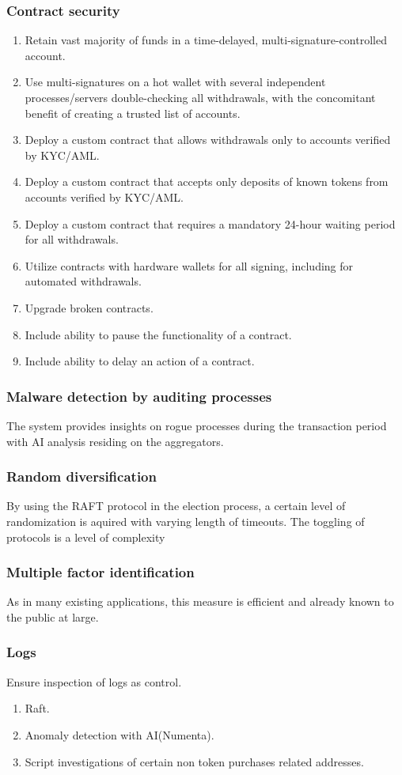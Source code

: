 \documentclass[]{article}
\begin{document}
{		\subsubsection{Contract security}
		\begin{enumerate}
		\item Retain vast majority of funds in a time-delayed, multi-signature-controlled account.
		\item Use multi-signatures on a hot wallet with several independent processes/servers double-checking all withdrawals, with the concomitant benefit of creating a trusted list of accounts.
		\item Deploy a custom contract that allows withdrawals only to accounts verified by KYC/AML.
		\item Deploy a custom contract that accepts only deposits of known tokens from accounts verified by KYC/AML.
		\item Deploy a custom contract that requires a mandatory 24-hour waiting period for all withdrawals.
		\item Utilize contracts with hardware wallets for all signing, including for automated withdrawals.
		\item Upgrade broken contracts.
		\item Include ability to pause the functionality of a contract.
		\item Include ability to delay an action of a contract.
		\end{enumerate}
		\subsubsection{Malware detection by auditing processes}
		The system provides insights on rogue processes during the transaction period with AI analysis residing on the aggregators. 
		\subsubsection{Random diversification}
		By using the RAFT protocol in the election process, a certain level of randomization is aquired with varying length of timeouts. 
		The toggling of protocols is a level of complexity 
		\subsubsection{Multiple factor identification}
		As in many existing applications, this measure is efficient and already known to the public at large.
		\subsubsection {Logs}
			Ensure inspection of logs as control.
			\begin{enumerate}
				\item Raft.
				\item Anomaly detection with AI(Numenta).
				\item Script investigations of certain non token purchases related addresses.
			\end{enumerate}
}
\end{document}
